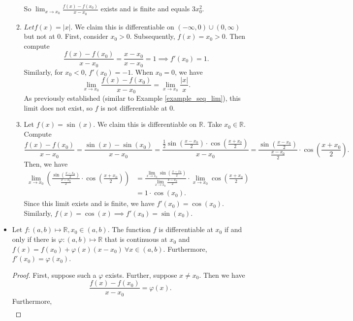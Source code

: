 \documentclass{article}
\newcommand{\R}{\mathbb{R}}
\newcommand{\?}{\stackrel{?}{=}}
\theoremstyle{definition} %
\begin{document}
\begin{itemize}
\begin{enumerate}[label=(\arabic*)]
        So $\lim_{x \to x_0} \frac{f(x) - f(x_0)}{x - x_0}$ exists and is finite and equals $3x_0^2$.
        \item $Let f(x) = |x|$. We claim this is differentiable on $(-\infty, 0) \cup (0, \infty)$ but not at 0. First, consider $x_0 > 0$. Subsequently, $f(x) = x_0 > 0$. Then compute
        $$\frac{f(x) - f(x_0)}{x - x_0} = \frac{x - x_0}{x - x_0} = 1 \implies f'(x_0) = 1.$$
        Similarly, for $x_0 < 0$, $f'(x_0) = -1$. When $x_0 = 0$, we have
        $$\lim_{x \to x_0} \frac{f(x) - f(x_0)}{x - x_0} = \lim_{x \to x_0 }\frac{|x|}{x}.$$
        As previously established (similar to Example \ref{example_seq_lim}), this limit does not exist, so $f$ is not differentiable at 0.
        \item Let $f(x) = \sin(x)$. We claim this is differentiable on $\R$. Take $x_0 \in \R$. Compute
        $$\frac{f(x) - f(x_0)}{x - x_0} = \frac{\sin(x) - \sin(x_0)}{x - x_0} = \frac{\frac{1}{2}\sin(\frac{x - x_0}{2}) \cdot \cos(\frac{x + x_0}{2})}{x - x_0} = \frac{\sin(\frac{x - x_0}{2})}{\frac{x - x_0}{2}} \cdot \cos(\frac{x + x_0}{2}).$$
        Then, we have
        \begin{align*}
            \lim_{x \to x_0} \left(\frac{\sin(\frac{x - x_0}{2})}{\frac{x - x_0}{2}} \cdot \cos\left(\frac{x + x_0}{2}\right)\right) &= \frac{\lim_{x \to x_0} \sin(\frac{x - x_0}{2})}{\lim_{x \to x_0} \frac{x - x_0}{2}} \cdot \lim_{x \to x_0} \cos(\frac{x + x_0}{2}) \\
            &= 1 \cdot \cos(x_0).
        \end{align*}
        Since this limit exists and is finite, we have $f'(x_0) = \cos(x_0)$. Similarly, $f(x) = \cos(x) \implies f'(x_0) = \sin(x_0)$.
    \end{enumerate}
    \item[]
    \begin{theorem}
        Let $f: (a, b) \mapsto \R, x_0 \in (a, b)$. The function $f$ is differentiable at $x_0$ if and only if there is $\varphi: (a, b) \mapsto \R$ that is continuous at $x_0$ and $f(x) = f(x_0) + \varphi(x)(x - x_0) \ \forall x \in (a, b)$. Furthermore, $f'(x_0) = \varphi(x_0)$.
        \label{thm:caratheodory}
    \end{theorem}
    \begin{proof}
        First, suppose such a $\varphi$ exists. Further, suppose $x \neq x_0$. Then we have
        $$\frac{f(x) - f(x_0)}{x - x_0} = \varphi(x).$$
        Furthermore,
        \begin{align*}

\end{align*}
\end{proof}
\end{itemize}
\end{document}
